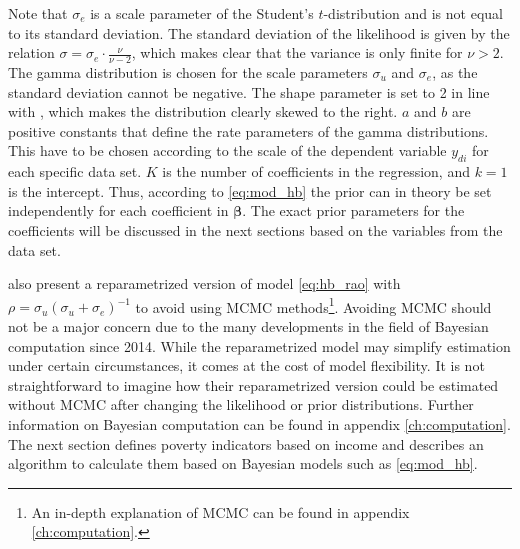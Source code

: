 Note that $\sigma_e$ is a scale parameter of the Student's $t$-distribution and is not equal to its standard deviation.
The standard deviation of the likelihood is given by the relation $\sigma = \sigma_e \cdot \frac{\nu}{\nu - 2}$, which makes clear that the variance is only finite for $\nu > 2$.
The gamma distribution is chosen for the scale parameters $\sigma_u$ and $\sigma_e$, as the standard deviation cannot be negative.
The shape parameter is set to 2 in line with \cite{gelman_prior_2020}, which makes the distribution clearly skewed to the right.
$a$ and $b$ are positive constants that define the rate parameters of the gamma distributions.
This have to be chosen according to the scale of the dependent variable $y_{di}$ for each specific data set.
$K$ is the number of coefficients in the regression, and $k = 1$ is the intercept.
Thus, according to \ref{eq:mod_hb} the prior can in theory be set independently for each coefficient in $\boldsymbol \beta$.
The exact prior parameters for the coefficients will be discussed in the next sections based on the variables from the data set.


\cite{molina_small_2014} also present a reparametrized version of model \ref{eq:hb_rao} with $\rho = \sigma_u(\sigma_u + \sigma_e)^{-1} $ to avoid using MCMC methods\footnote{An in-depth explanation of MCMC can be found in appendix \ref{ch:computation}.}.
Avoiding MCMC should not be a major concern due to the many developments in the field of Bayesian computation since 2014.
While the reparametrized model may simplify estimation under certain circumstances, it comes at the cost of model flexibility. It is not straightforward to imagine how their reparametrized version could be estimated without MCMC after changing the likelihood or prior distributions.
Further information on Bayesian computation can be found in appendix \ref{ch:computation}.
The next section defines poverty indicators based on income and describes an algorithm to calculate them based on Bayesian models such as \ref{eq:mod_hb}.